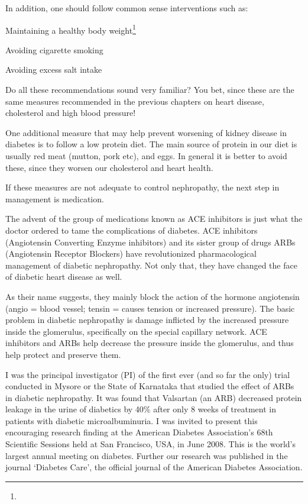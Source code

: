 In addition, one should follow common sense interventions such as:

\item Maintaining a healthy body weight\footnote{}

 \item Avoiding cigarette smoking

 \item Avoiding excess salt intake

Do all these recommendations sound very familiar? You bet, since these are the same measures recommended in the previous chapters on heart disease, cholesterol and high blood pressure!

One additional measure that may help prevent worsening of kidney disease in diabetes is to follow a low protein diet. The main source of protein in our diet is usually red meat (mutton, pork etc), and eggs. In general it is better to avoid these, since they worsen our cholesterol and heart health.

If these measures are not adequate to control nephropathy, the next step in management is medication.


The advent of the group of medications known as ACE inhibitors is just what the doctor ordered to tame the complications of diabetes. ACE inhibitors (Angiotensin Converting Enzyme inhibitors) and its sister group of drugs ARBs (Angiotensin Receptor Blockers) have revolutionized pharmacological management of diabetic nephropathy. Not only that, they have changed the face of diabetic heart disease as well.

As their name suggests, they mainly block the action of the hormone angiotensin (angio = blood vessel; tensin = causes tension or increased pressure). The basic problem in diabetic nephropathy is damage inflicted by the increased pressure inside the glomerulus, specifically on the special capillary network. ACE inhibitors and ARBs help decrease the pressure inside the glomerulus, and thus help protect and preserve them.

I was the principal investigator (PI) of the first ever (and so far the only) trial conducted in Mysore or the State of Karnataka that studied the effect of ARBs in diabetic nephropathy. It was found that Valsartan (an ARB) decreased protein leakage in the urine of diabetics by 40\% after only 8 weeks of treatment in patients with diabetic microalbuminuria. I was invited to present this encouraging research finding at the American Diabetes Association’s 68th Scientific Sessions held at San Francisco, USA, in June 2008. This is the world’s largest annual meeting on diabetes. Further our research was published in the journal ‘Diabetes Care’, the official journal of the American Diabetes Association.

